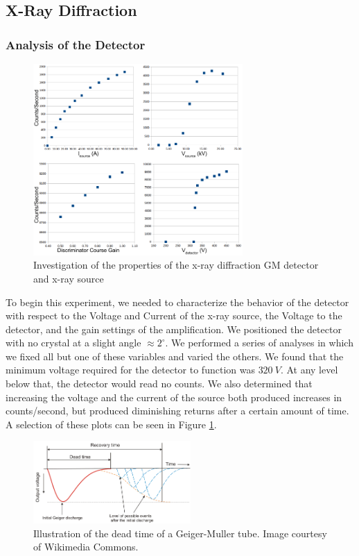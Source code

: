 \documentclass[%
 reprint,
 amsmath,amssymb,
 aps,
 pra,
]{revtex4-1}
\begin{document}
\subsection{X-Ray Diffraction}

\subsubsection{Analysis of the Detector}

\begin{figure}[H]
	\centering
	\includegraphics[width=8cm]{xrd_setup_investigation.png}
	\caption{Investigation of the properties of the x-ray diffraction GM detector and x-ray source}
	\label{fig:xrf_setup_investigation}
\end{figure}

To begin this experiment, we needed to characterize the behavior of the detector with respect to the Voltage and Current of the x-ray source, the Voltage to the detector, and the gain settings of the amplification. We positioned the detector with no crystal at a slight angle $\approx 2^\circ$. We performed a series of analyses in which we fixed all but one of these variables and varied the others. We found that the minimum voltage required for the detector to function was $320~V$. At any level below that, the detector would read no counts. We also determined that increasing the voltage and the current of the source both produced increases in counts/second, but produced diminishing returns after a certain amount of time. A selection of these plots can be seen in Figure \ref{fig:xrf_setup_investigation}.

\begin{figure}[H]
	\centering
	\includegraphics[width=6cm]{dead_time.png}
	\caption{Illustration of the dead time of a Geiger-Muller tube. Image courtesy of Wikimedia Commons.}
	\label{fig:dead_time}
\end{figure}
\end{document}
